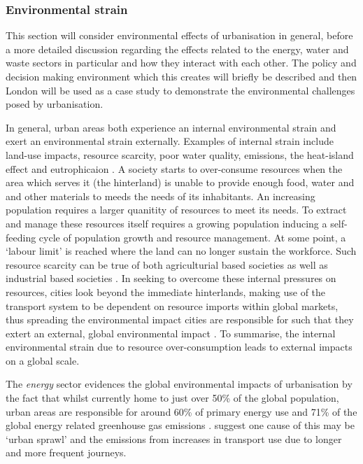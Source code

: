\subsubsection*{Environmental strain} 
This section will consider environmental effects of urbanisation in general, before a more detailed discussion regarding the effects related to the energy, water and waste sectors in particular and how they interact with each other. The policy and decision making environment which this creates will briefly be described and then London will be used as a case study to demonstrate the environmental challenges posed by urbanisation.

In general, urban areas both experience an internal environmental strain and exert an environmental strain externally. Examples of internal strain include land-use impacts, resource scarcity, poor water quality, emissions, the heat-island effect and eutrophicaion \citep{Cao2011}. A society starts to over-consume resources when the area which serves it (the hinterland) is unable to provide enough food, water and and other materials to meeds the needs of its inhabitants. An increasing population requires a larger quanitity of resources to meet its needs. To extract and manage these resources itself requires a growing population inducing a self-feeding cycle of population  growth and resource management. At some point, a `labour limit' is reached where the land can no longer sustain the workforce. Such resource scarcity can be true of both agriculturial based societies as well as industrial based societies \citep{Haberl2001a, Haberl2001, Gr2003}. In seeking to overcome these internal pressures on resources, cities look beyond the immediate hinterlands, making use of the transport system to be dependent on resource imports within global markets, thus spreading the environmental impact cities are responsible for such that they extert an external, global environmental impact \citep{Agudelo-Vera2011}. To summarise, the internal environmental strain due to resource over-consumption leads to external impacts on a global scale.

The \emph{energy} sector evidences the global environmental impacts of urbanisation by the fact that whilst currently home to just over 50\% of the global population, urban areas are responsible for around 60\% of primary energy use and 71\% of the global energy related greenhouse gas emissions \citep{IEA2008}. \citet{Grubler2009} suggest one cause of this may be `urban sprawl' and the emissions from increases in transport use due to longer and more frequent journeys.

